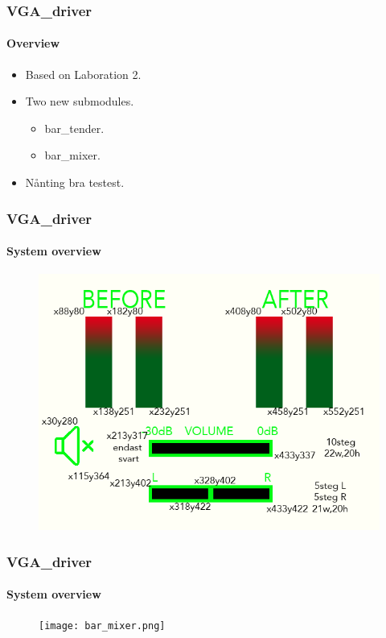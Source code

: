 
\begin{frame}
  \frametitle{VGA\_driver}
  \framesubtitle{Overview}
  \begin{itemize}
  \item<1-> Based on Laboration 2.
  \item<2-> Two new submodules.
    \begin{itemize}
    \item<3-> bar\_tender.
    \item<4-> bar\_mixer.
    \end{itemize}
  \item<5-> Nånting bra testest.
  \end{itemize}
\end{frame}


\begin{frame}
  \frametitle{VGA\_driver}
  \framesubtitle{System overview}
  \begin{figure}[H]
    \centering 
    \includegraphics[scale=0.80]{picture_xy.png} 
    \label{fig:picture_xy.png}
  \end{figure}
\end{frame}

\begin{frame}
  
  \frametitle{VGA\_driver}
  \framesubtitle{System overview}
  \begin{figure}[l]
    \centering 
    \texttt{[image: bar\_mixer.png]} 
    \label{fig:bar_mixer.png}
  \end{figure}
\end{frame}
